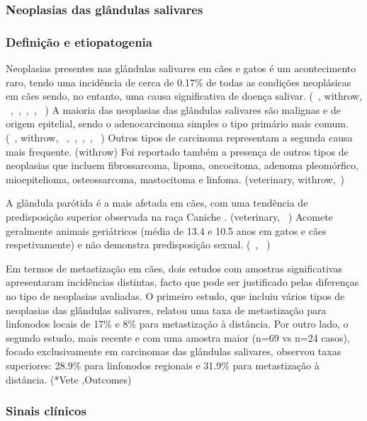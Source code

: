   
\subsubsection{Neoplasias das glândulas salivares}
\subsubsection{Definição e etiopatogenia}


Neoplasias presentes nas glândulas salivares em cães e gatos é um acontecimento raro, tendo uma incidência de cerca de 0.17\% de todas as condições neoplásicas em cães sendo, no entanto, uma causa significativa de doença salivar. (~\cite{Almeida2010}, withrow, ~\cite{Oshikata2006},~\cite{Hammer2001},~\cite{campos2019},~\cite{Cray2020}, ~\cite{deLaPuerta2020}) A maioria das neoplasias das glândulas salivares são malignas e de origem epitelial, sendo o adenocarcinoma simples o tipo primário mais comum. (~\cite{Almeida2010}, withrow, ~\cite{Oshikata2006},~\cite{Hammer2001},~\cite{campos2019},~\cite{Cray2020}, ~\cite{deLaPuerta2020}) Outros tipos de carcinoma representam a segunda causa mais frequente. (withrow) Foi reportado também a presença de outros tipos de neoplasias que incluem fibrossarcoma, lipoma, oncocitoma, adenoma pleomórfico, mioepitelioma, osteossarcoma, mastocitoma e linfoma. (veterinary, withrow,~\cite{Cray2020})


A glândula parótida é a mais afetada em cães, com uma tendência de predisposição superior  observada na raça Caniche . (veterinary, ~\cite{Oshikata2006}) Acomete geralmente animais geriátricos (média de 13.4 e 10.5 anos em gatos e cães respetivamente) e não demonstra predisposição sexual. (~\cite{Cray2020}, ~\cite{deLaPuerta2020})


Em termos de metastização em cães, dois estudos com amostras significativas apresentaram incidências distintas, facto que pode ser justificado pelas diferenças no tipo de neoplasias avaliadas. O primeiro estudo, que incluiu vários tipos de neoplasias das glândulas salivares, relatou uma taxa de metastização para linfonodos locais de 17\% e 8\% para metastização à distância. Por outro lado, o segundo estudo, mais recente e com uma amostra maior (n=69 vs n=24 casos), focado exclusivamente em carcinomas das glândulas salivares, observou taxas superiores: 28.9\% para linfonodos regionais e 31.9\% para metastização à distância. (*Vete ,Outcomes)


\subsubsection{Sinais clínicos}


